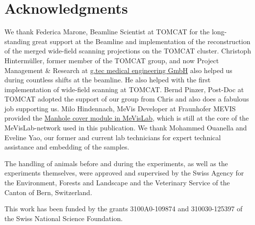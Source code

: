 \documentclass[%
	paper=a4,%
	abstract=true,%
	]{scrartcl}
\begin{document}
\section{Acknowledgments}
We thank Federica Marone, Beamline Scientist at TOMCAT for the long-standing great support at the Beamline and implementation of the reconstruction of the merged wide-field scanning projections on the TOMCAT cluster. Christoph Hinterm\"{u}ller, former member of the TOMCAT group, and now Project Management \& Research at \href{http://gtec.at/}{g.tec medical engineering GmbH} also helped us during countless shifts at the beamline. He also helped with the first implementation of wide-field scanning at TOMCAT. Bernd Pinzer, Post-Doc at TOMCAT adopted the support of our group from Chris and also does a fabulous job supporting us. Milo Hindennach, MeVis Developer at Fraunhofer MEVIS provided the \href{http://www.mevis-research.de/cgi-bin/discus/board-auth.cgi?lm=1282233250&file=/839/11760.html}{Manhole cover module in MeVisLab}, which is still at the core of the MeVisLab-network used in this publication. We thank Mohammed Ouanella and Eveline Yao, our former and current lab technicians for expert technical assistance and embedding of the samples.

The handling of animals before and during the experiments, as well as the experiments themselves, were approved and supervised by the Swiss Agency for the Environment, Forests and Landscape and the Veterinary Service of the Canton of Bern, Switzerland.

This work has been funded by the grants 3100A0-109874 and 310030-125397 of the Swiss National Science Foundation.

\singlespacing


\end{document}
